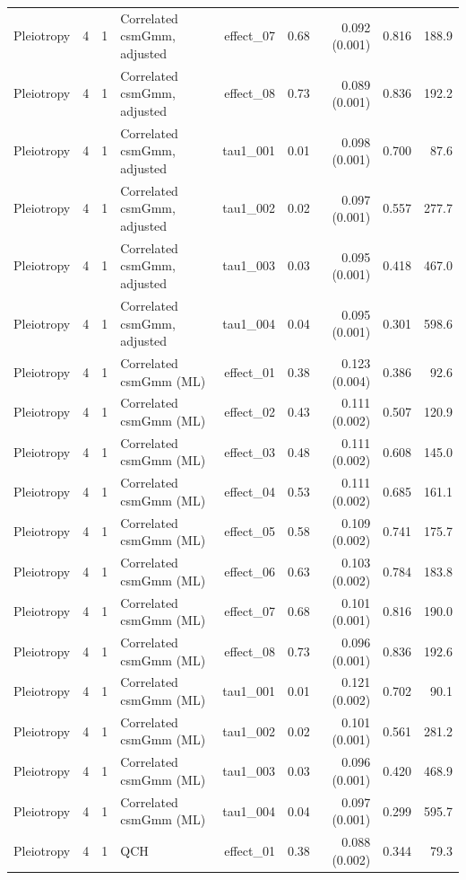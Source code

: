 \begin{longtable}{lcclrrrrr}
Pleiotropy & 4 & 1 & Correlated csmGmm, adjusted & effect\_07 & 0.68 & 0.092 (0.001) & 0.816 & 188.9\\
Pleiotropy & 4 & 1 & Correlated csmGmm, adjusted & effect\_08 & 0.73 & 0.089 (0.001) & 0.836 & 192.2\\
Pleiotropy & 4 & 1 & Correlated csmGmm, adjusted & tau1\_001 & 0.01 & 0.098 (0.001) & 0.700 & 87.6\\
Pleiotropy & 4 & 1 & Correlated csmGmm, adjusted & tau1\_002 & 0.02 & 0.097 (0.001) & 0.557 & 277.7\\
Pleiotropy & 4 & 1 & Correlated csmGmm, adjusted & tau1\_003 & 0.03 & 0.095 (0.001) & 0.418 & 467.0\\
Pleiotropy & 4 & 1 & Correlated csmGmm, adjusted & tau1\_004 & 0.04 & 0.095 (0.001) & 0.301 & 598.6\\
Pleiotropy & 4 & 1 & Correlated csmGmm (ML) & effect\_01 & 0.38 & 0.123 (0.004) & 0.386 & 92.6\\
Pleiotropy & 4 & 1 & Correlated csmGmm (ML) & effect\_02 & 0.43 & 0.111 (0.002) & 0.507 & 120.9\\
Pleiotropy & 4 & 1 & Correlated csmGmm (ML) & effect\_03 & 0.48 & 0.111 (0.002) & 0.608 & 145.0\\
Pleiotropy & 4 & 1 & Correlated csmGmm (ML) & effect\_04 & 0.53 & 0.111 (0.002) & 0.685 & 161.1\\
Pleiotropy & 4 & 1 & Correlated csmGmm (ML) & effect\_05 & 0.58 & 0.109 (0.002) & 0.741 & 175.7\\
Pleiotropy & 4 & 1 & Correlated csmGmm (ML) & effect\_06 & 0.63 & 0.103 (0.002) & 0.784 & 183.8\\
Pleiotropy & 4 & 1 & Correlated csmGmm (ML) & effect\_07 & 0.68 & 0.101 (0.001) & 0.816 & 190.0\\
Pleiotropy & 4 & 1 & Correlated csmGmm (ML) & effect\_08 & 0.73 & 0.096 (0.001) & 0.836 & 192.6\\
Pleiotropy & 4 & 1 & Correlated csmGmm (ML) & tau1\_001 & 0.01 & 0.121 (0.002) & 0.702 & 90.1\\
Pleiotropy & 4 & 1 & Correlated csmGmm (ML) & tau1\_002 & 0.02 & 0.101 (0.001) & 0.561 & 281.2\\
Pleiotropy & 4 & 1 & Correlated csmGmm (ML) & tau1\_003 & 0.03 & 0.096 (0.001) & 0.420 & 468.9\\
Pleiotropy & 4 & 1 & Correlated csmGmm (ML) & tau1\_004 & 0.04 & 0.097 (0.001) & 0.299 & 595.7\\
Pleiotropy & 4 & 1 & QCH & effect\_01 & 0.38 & 0.088 (0.002) & 0.344 & 79.3\\

\end{longtable}
